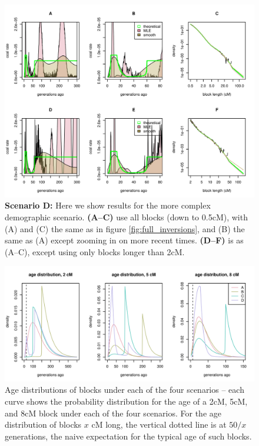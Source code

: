 \documentclass{article}
\begin{document}
\begin{figure}[htp!]
\begin{center}
\includegraphics{complex-inversions}
\caption{
\label{fig:complex_inversions}
{\bf Scenario D:} Here we show results for the more complex demographic scenario.
{\bf (A--C)} use all blocks (down to 0.5cM), with (A) and (C) the same as in figure \ref{fig:full_inversions},
and (B) the same as (A) except zooming in on more recent times.
{\bf (D--F)} is as (A--C), except using only blocks longer than 2cM.
}
\end{center}
\end{figure}


\begin{figure}[htp!]
\begin{center}
  \includegraphics{age-distributions}
\caption{
\label{fig:age_distributions}
Age distributions of blocks under each of the four scenarios --
each curve shows the probability distribution for the age of a 2cM, 5cM, and 8cM block
under each of the four scenarios.
For the age distribution of blocks $x$ cM long, the vertical dotted line is at $50/x$ generations,
the naive expectation for the typical age of such blocks.
}
\end{center}
\end{figure}
\end{document}
